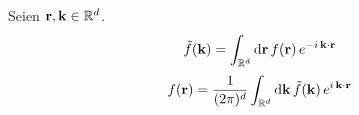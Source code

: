 \begin{framedprop}
Seien $\mathbf{r}, \mathbf{k} \in \mathbb{R}^d$.
\[
\tilde{f}(\mathbf{k}) = \int_{\mathbb{R}^d} \mathrm{d}\mathbf{r}\, f(\mathbf{r})\, e^{-i\,\mathbf{k}\cdot\mathbf{r}}
\]
\[
f(\mathbf{r}) = \frac{1}{(2\pi)^d} \int_{\mathbb{R}^d} \mathrm{d}\mathbf{k}\, \tilde{f}(\mathbf{k})\, e^{i\,\mathbf{k}\cdot\mathbf{r}}
\]
	
\end{framedprop}